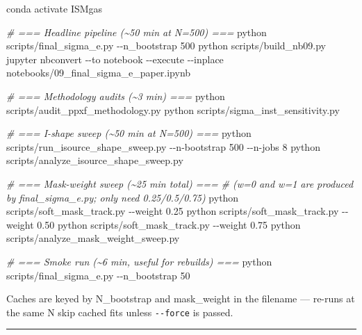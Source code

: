 \documentclass[
  10pt,
]{article}
\newenvironment{Shaded}{}{}
\newcommand{\AttributeTok}[1]{\textcolor[rgb]{0.49,0.56,0.16}{#1}}
\newcommand{\CommentTok}[1]{\textcolor[rgb]{0.38,0.63,0.69}{\textit{#1}}}
\newcommand{\ExtensionTok}[1]{#1}
\newcommand{\NormalTok}[1]{#1}
\begin{document}
\begin{Shaded}
\begin{Highlighting}[]
\ExtensionTok{conda}\NormalTok{ activate ISMgas}

\CommentTok{\# === Headline pipeline (\textasciitilde{}50 min at N=500) ===}
\ExtensionTok{python}\NormalTok{ scripts/final\_sigma\_e.py }\AttributeTok{{-}{-}n\_bootstrap}\NormalTok{ 500}
\ExtensionTok{python}\NormalTok{ scripts/build\_nb09.py}
\ExtensionTok{jupyter}\NormalTok{ nbconvert }\AttributeTok{{-}{-}to}\NormalTok{ notebook }\AttributeTok{{-}{-}execute} \AttributeTok{{-}{-}inplace}\NormalTok{ notebooks/09\_final\_sigma\_e\_paper.ipynb}

\CommentTok{\# === Methodology audits (\textasciitilde{}3 min) ===}
\ExtensionTok{python}\NormalTok{ scripts/audit\_ppxf\_methodology.py}
\ExtensionTok{python}\NormalTok{ scripts/sigma\_inst\_sensitivity.py}

\CommentTok{\# === I{-}shape sweep (\textasciitilde{}50 min at N=500) ===}
\ExtensionTok{python}\NormalTok{ scripts/run\_isource\_shape\_sweep.py }\AttributeTok{{-}{-}n{-}bootstrap}\NormalTok{ 500 }\AttributeTok{{-}{-}n{-}jobs}\NormalTok{ 8}
\ExtensionTok{python}\NormalTok{ scripts/analyze\_isource\_shape\_sweep.py}

\CommentTok{\# === Mask{-}weight sweep (\textasciitilde{}25 min total) ===}
\CommentTok{\# (w=0 and w=1 are produced by final\_sigma\_e.py; only need 0.25/0.5/0.75)}
\ExtensionTok{python}\NormalTok{ scripts/soft\_mask\_track.py }\AttributeTok{{-}{-}weight}\NormalTok{ 0.25}
\ExtensionTok{python}\NormalTok{ scripts/soft\_mask\_track.py }\AttributeTok{{-}{-}weight}\NormalTok{ 0.50}
\ExtensionTok{python}\NormalTok{ scripts/soft\_mask\_track.py }\AttributeTok{{-}{-}weight}\NormalTok{ 0.75}
\ExtensionTok{python}\NormalTok{ scripts/analyze\_mask\_weight\_sweep.py}

\CommentTok{\# === Smoke run (\textasciitilde{}6 min, useful for rebuilds) ===}
\ExtensionTok{python}\NormalTok{ scripts/final\_sigma\_e.py }\AttributeTok{{-}{-}n\_bootstrap}\NormalTok{ 50}
\end{Highlighting}
\end{Shaded}

Caches are keyed by N\_bootstrap and mask\_weight in the filename --- re-runs at the same N skip cached fits unless \texttt{-\/-force} is passed.

\begin{center}\rule{0.5\linewidth}{0.5pt}\end{center}
\end{document}

